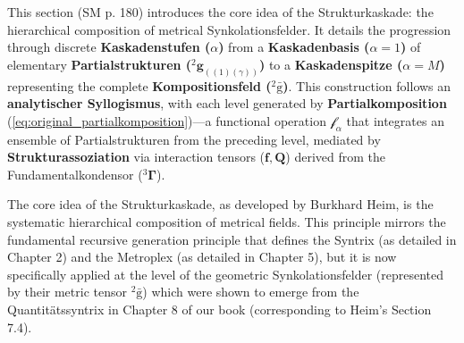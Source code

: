 \documentclass[12pt]{article}
\newcommand{\kompositionsfeld}{{}^2\bar{\mathrm{g}}}
\newcommand{\partialstruktur}[1]{{}^2\mathbf{g}_{(#1)}}
\newcommand{\fundamentalkondensor}{{}^3\bm{\Gamma}}
\newcommand{\korrelationstensor}{\mathbf{f}}
\newcommand{\koppelungstensor}{\mathbf{Q}}
\newcommand{\kaskadenstufe}{\alpha}
\begin{document}
This section (SM p. 180) introduces the core idea of the Strukturkaskade: the hierarchical composition of metrical Synkolationsfelder. It details the progression through discrete \textbf{Kaskadenstufen (\(\kaskadenstufe\))} from a \textbf{Kaskadenbasis (\(\kaskadenstufe=1\))} of elementary \textbf{Partialstrukturen (\(\partialstruktur{(1)(\gamma)}\))} to a \textbf{Kaskadenspitze (\(\kaskadenstufe=M\))} representing the complete \textbf{Kompositionsfeld (\(\kompositionsfeld\))}. This construction follows an \textbf{analytischer Syllogismus}, with each level generated by \textbf{Partialkomposition} (\eqref{eq:original_partialkomposition})—a functional operation \( \mathcal{f}_\alpha \) that integrates an ensemble of Partialstrukturen from the preceding level, mediated by \textbf{Strukturassoziation} via interaction tensors (\(\korrelationstensor, \koppelungstensor\)) derived from the Fundamentalkondensor (\(\fundamentalkondensor\)).

The core idea of the Strukturkaskade, as developed by Burkhard Heim, is the systematic hierarchical composition of metrical fields. This principle mirrors the fundamental recursive generation principle that defines the Syntrix (as detailed in Chapter 2) and the Metroplex (as detailed in Chapter 5), but it is now specifically applied at the level of the geometric Synkolationsfelder (represented by their metric tensor \( \kompositionsfeld \)) which were shown to emerge from the Quantitätssyntrix in Chapter 8 of our book (corresponding to Heim's Section 7.4).
\end{document}
